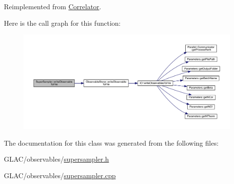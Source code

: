 Reimplemented from \mbox{\hyperlink{class_correlator_a9e8d80e30e4fbe3b7fe57521538cb5ff}{Correlator}}.

Here is the call graph for this function\+:
\nopagebreak
\begin{figure}[H]
\begin{center}
\leavevmode
\includegraphics[width=350pt]{class_super_sampler_a05b42b82879233dc329d280a61bfd7f0_cgraph}
\end{center}
\end{figure}


The documentation for this class was generated from the following files\+:\begin{DoxyCompactItemize}
\item 
G\+L\+A\+C/observables/\mbox{\hyperlink{supersampler_8h}{supersampler.\+h}}\item 
G\+L\+A\+C/observables/\mbox{\hyperlink{supersampler_8cpp}{supersampler.\+cpp}}\end{DoxyCompactItemize}

